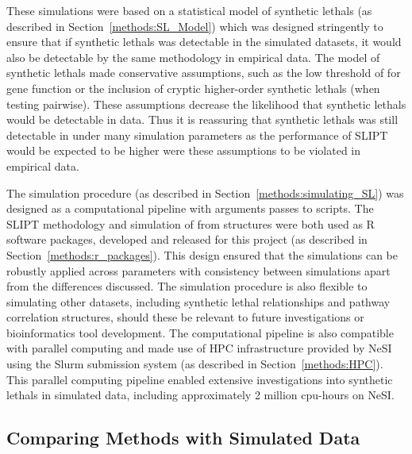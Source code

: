 These simulations were based on a statistical model of \glspl{synthetic lethal} (as described in Section~\ref{methods:SL_Model}) which was designed stringently to ensure that if \glspl{synthetic lethal} was detectable in the simulated datasets, it would also be detectable by the same methodology in empirical  data. The model of \glspl{synthetic lethal} made conservative assumptions, such as the low threshold of  for gene function or the inclusion of cryptic higher-order \glspl{synthetic lethal} (when testing pairwise). These assumptions decrease the likelihood that \glspl{synthetic lethal}  would be detectable in  data. Thus it is reassuring that \glspl{synthetic lethal} was still detectable in under many simulation parameters as the performance of \gls{SLIPT} would be expected to be higher were these assumptions to be violated in empirical data.


The simulation procedure (as described in Section~\ref{methods:simulating_SL}) was designed as a computational pipeline with arguments passes to scripts. The \gls{SLIPT} methodology and simulation of  from  structures were both used as R \citep{R_core} software packages, developed and released for this project (as described in Section~\ref{methods:r_packages}). This design ensured that the simulations can be robustly applied across parameters with consistency between simulations apart from the differences discussed. The simulation procedure is also flexible to simulating other datasets, including \gls{synthetic lethal} relationships and pathway correlation structures, should these be relevant to future investigations or \gls{bioinformatics} tool development. The computational pipeline is also compatible with parallel computing and made use of \gls{HPC} infrastructure provided by \gls{NeSI} using the \gls{Slurm} submission system (as described in Section~\ref{methods:HPC}). This parallel computing pipeline enabled extensive investigations into \glspl{synthetic lethal} in simulated data, including approximately 2 million cpu-hours on \gls{NeSI}. 


\subsection{Comparing Methods with Simulated Data}

